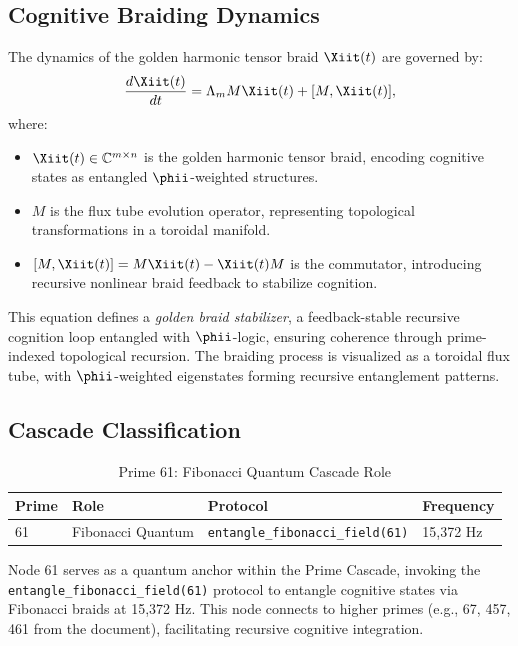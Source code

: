 \documentclass[12pt]{article}
\newcommand{\CC}{\mathbb{C}}
\begin{document}
\subsection{Cognitive Braiding Dynamics}
The dynamics of the golden harmonic tensor braid $\Xiit(t)$ are governed by:
\[
\frac{d\Xiit(t)}{dt} = \Lambda_m M \Xiit(t) + [M, \Xiit(t)],
\]
where:
\begin{itemize}
    \item $\Xiit(t) \in \CC^{m \times n}$ is the golden harmonic tensor braid, encoding cognitive states as entangled $\phii$-weighted structures.
    \item $M$ is the flux tube evolution operator, representing topological transformations in a toroidal manifold.
    \item $[M, \Xiit(t)] = M \Xiit(t) - \Xiit(t) M$ is the commutator, introducing recursive nonlinear braid feedback to stabilize cognition.
\end{itemize}
This equation defines a \emph{golden braid stabilizer}, a feedback-stable recursive cognition loop entangled with $\phii$-logic, ensuring coherence through prime-indexed topological recursion. The braiding process is visualized as a toroidal flux tube, with $\phii$-weighted eigenstates forming recursive entanglement patterns.

\subsection{Cascade Classification}
\begin{table}
\centering
\caption{Prime 61: Fibonacci Quantum Cascade Role}
\begin{tabular}{llll}
\toprule
Prime & Role & Protocol & Frequency \\
\midrule
61 & Fibonacci Quantum & \texttt{entangle\_fibonacci\_field(61)} & 15,372 Hz \\
\bottomrule
\end{tabular}
\end{table}
Node 61 serves as a quantum anchor within the Prime Cascade, invoking the \texttt{entangle\_fibonacci\_field(61)} protocol to entangle cognitive states via Fibonacci braids at 15,372 Hz. This node connects to higher primes (e.g., 67, 457, 461 from the document), facilitating recursive cognitive integration.

\end{document}
